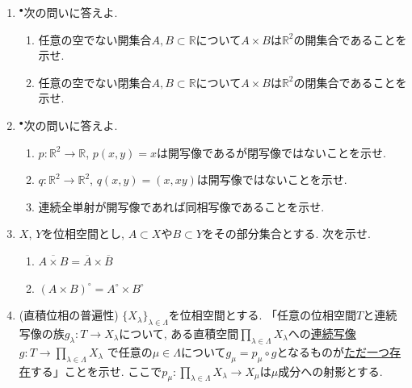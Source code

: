 \documentclass[dvipdfmx,a4paper,11pt]{article}
\newcommand{\R}{\mathbb{R}}
\theoremstyle{definition}
\begin{document}
 
\begin{enumerate}[ label=\textbf{問}\ref*{sec-product}.\arabic*]
	\setlength{\parskip}{0cm} 
  \setlength{\itemsep}{7pt} 


\item $^{\bullet}$次の問いに答えよ.
\begin{enumerate}
\setlength{\parskip}{0cm} 
  \setlength{\itemsep}{0cm} 
  \item 任意の空でない開集合$A,B \subset \R$について$A \times B$は$\R^2$の開集合であることを示せ.
  \item 任意の空でない閉集合$A,B \subset \R$について$A \times B$は$\R^2$の閉集合であることを示せ.
\end{enumerate}

\item $^{\bullet}$次の問いに答えよ.
  \begin{enumerate}
\setlength{\parskip}{0cm} 
  \setlength{\itemsep}{0cm} 
\item  $p : \R^{2} \rightarrow \R$, $p(x,y)=x$は開写像であるが閉写像ではないことを示せ. 
\item $q : \R^{2} \rightarrow \R^2$, $q(x,y)=(x,xy)$は開写像ではないことを示せ.
\item 連続全単射が開写像であれば同相写像であることを示せ.
    \end{enumerate}  

\item $X$, $Y$を位相空間とし, $A \subset X$や$B \subset Y$をその部分集合とする. 次を示せ.
	\begin{enumerate}
		\setlength{\parskip}{0cm} 
  \setlength{\itemsep}{0pt} 
	\item $\overline{A \times  B} = \overline{A} \times \overline{B}$
	\item $(A \times  B)^\circ = A^\circ\times B^\circ$
	\end{enumerate}


\item (直積位相の普遍性)
$\{ X_\lambda \}_{\lambda \in \Lambda}$を位相空間とする. 
「任意の位相空間$T$と連続写像の族$g_{\lambda} : T \rightarrow X_\lambda $について, 
ある直積空間$\prod_{\lambda \in \Lambda} X_{\lambda}$への\underline{連続写像}$g : T \rightarrow \prod_{\lambda \in \Lambda} X_{\lambda}$
で任意の$\mu \in \Lambda$について$g_{\mu} = p_{\mu} \circ g $となるものが\underline{ただ一つ存在}する」ことを示せ. 
ここで$p_{\mu}: \prod_{\lambda \in \Lambda} X_{\lambda} \to X_{\mu}$は$\mu$成分への射影とする. 


\end{enumerate}
\end{document}
